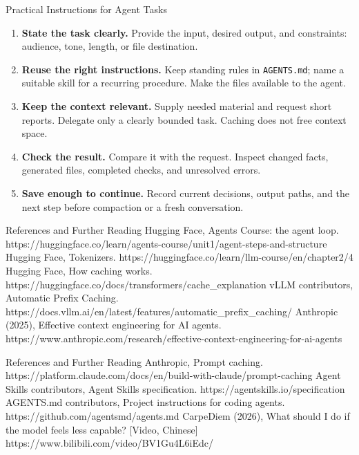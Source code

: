\begin{frame}{Practical Instructions for Agent Tasks}
\small
\begin{enumerate}
\item \textbf{State the task clearly.} Provide the input, desired output, and constraints: audience, tone, length, or file destination.
\item \textbf{Reuse the right instructions.} Keep standing rules in \texttt{AGENTS.md}; name a suitable skill for a recurring procedure. Make the files available to the agent.
\item \textbf{Keep the context relevant.} Supply needed material and request short reports. Delegate only a clearly bounded task. Caching does not free context space.
\item \textbf{Check the result.} Compare it with the request. Inspect changed facts, generated files, completed checks, and unresolved errors.
\item \textbf{Save enough to continue.} Record current decisions, output paths, and the next step before compaction or a fresh conversation.
\end{enumerate}
\end{frame}

\begin{frame}{References and Further Reading}
  {Hugging Face, Agents Course: the agent loop.}
  {https://huggingface.co/learn/agents-course/unit1/agent-steps-and-structure}
  {}
  {Hugging Face, Tokenizers.}
  {https://huggingface.co/learn/llm-course/en/chapter2/4}
  {}
  {Hugging Face, How caching works.}
  {https://huggingface.co/docs/transformers/cache_explanation}
  {}
  {vLLM contributors, Automatic Prefix Caching.}
  {https://docs.vllm.ai/en/latest/features/automatic_prefix_caching/}
  {}
  {Anthropic (2025), Effective context engineering for AI agents.}
  {https://www.anthropic.com/research/effective-context-engineering-for-ai-agents}
  {}
\end{frame}
\begin{frame}{References and Further Reading}
  {Anthropic, Prompt caching.}
  {https://platform.claude.com/docs/en/build-with-claude/prompt-caching}
  {}
  {Agent Skills contributors, Agent Skills specification.}
  {https://agentskills.io/specification}
  {}
  {AGENTS.md contributors, Project instructions for coding agents.}
  {https://github.com/agentsmd/agents.md}
  {}
  {CarpeDiem (2026), What should I do if the model feels less capable? [Video, Chinese]}
  {https://www.bilibili.com/video/BV1Gu4L6iEdc/}
  {}
\end{frame}

